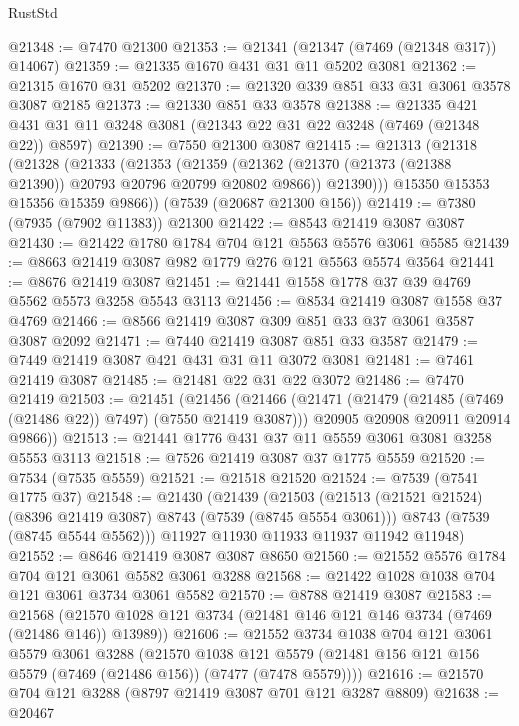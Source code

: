 \begin{lexlean}{RustStd}
\begin{coremodule}
@21348 := @7470 @21300
@21353 := @21341 (@21347 (@7469 (@21348 @317)) @14067)
@21359 := @21335 @1670 @431 @31 @11 @5202 @3081
@21362 := @21315 @1670 @31 @5202
@21370 := @21320 @339 @851 @33 @31 @3061 @3578 @3087 @2185
@21373 := @21330 @851 @33 @3578
@21388 := @21335 @421 @431 @31 @11 @3248 @3081 (@21343 @22 @31 @22 @3248 (@7469 (@21348 @22)) @8597)
@21390 := @7550 @21300 @3087
@21415 := @21313
    (@21318
      (@21328
        (@21333
          (@21353
            (@21359
              (@21362 (@21370 (@21373 (@21388 @21390)) @20793 @20796 @20799 @20802 @9866))
              @21390)))
        @15350
        @15353
        @15356
        @15359
        @9866))
    (@7539 (@20687 @21300 @156))
@21419 := @7380 (@7935 (@7902 @11383)) @21300
@21422 := @8543 @21419 @3087 @3087
@21430 := @21422 @1780 @1784 @704 @121 @5563 @5576 @3061 @5585
@21439 := @8663 @21419 @3087 @982 @1779 @276 @121 @5563 @5574 @3564
@21441 := @8676 @21419 @3087
@21451 := @21441 @1558 @1778 @37 @39 @4769 @5562 @5573 @3258 @5543 @3113
@21456 := @8534 @21419 @3087 @1558 @37 @4769
@21466 := @8566 @21419 @3087 @309 @851 @33 @37 @3061 @3587 @3087 @2092
@21471 := @7440 @21419 @3087 @851 @33 @3587
@21479 := @7449 @21419 @3087 @421 @431 @31 @11 @3072 @3081
@21481 := @7461 @21419 @3087
@21485 := @21481 @22 @31 @22 @3072
@21486 := @7470 @21419
@21503 := @21451
    (@21456
      (@21466
        (@21471 (@21479 (@21485 (@7469 (@21486 @22)) @7497) (@7550 @21419 @3087)))
        @20905
        @20908
        @20911
        @20914
        @9866))
@21513 := @21441 @1776 @431 @37 @11 @5559 @3061 @3081 @3258 @5553 @3113
@21518 := @7526 @21419 @3087 @37 @1775 @5559
@21520 := @7534 (@7535 @5559)
@21521 := @21518 @21520
@21524 := @7539 (@7541 @1775 @37)
@21548 := @21430
    (@21439
      (@21503
        (@21513 (@21521 @21524) (@8396 @21419 @3087) @8743 (@7539 (@8745 @5554 @3061)))
        @8743
        (@7539 (@8745 @5544 @5562)))
      @11927
      @11930
      @11933
      @11937
      @11942
      @11948)
@21552 := @8646 @21419 @3087 @3087 @8650
@21560 := @21552 @5576 @1784 @704 @121 @3061 @5582 @3061 @3288
@21568 := @21422 @1028 @1038 @704 @121 @3061 @3734 @3061 @5582
@21570 := @8788 @21419 @3087
@21583 := @21568
    (@21570 @1028 @121 @3734 (@21481 @146 @121 @146 @3734 (@7469 (@21486 @146)) @13989))
@21606 := @21552
    @3734
    @1038
    @704
    @121
    @3061
    @5579
    @3061
    @3288
    (@21570
      @1038
      @121
      @5579
      (@21481 @156 @121 @156 @5579 (@7469 (@21486 @156)) (@7477 (@7478 @5579))))
@21616 := @21570 @704 @121 @3288 (@8797 @21419 @3087 @701 @121 @3287 @8809)
@21638 := @20467

\end{coremodule}
\end{lexlean}
